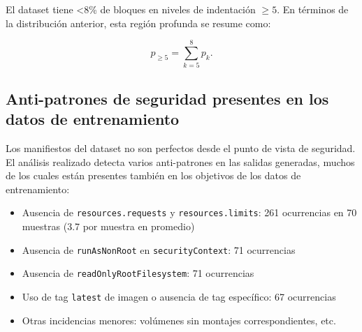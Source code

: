 El dataset tiene <8\% de bloques en niveles de indentación $\geq 5$. En términos de la distribución anterior, esta región profunda se resume como:

\[
p_{\geq 5} = \sum_{k=5}^{8} p_k.
\]

\subsection{Anti-patrones de seguridad presentes en los datos de entrenamiento}

Los manifiestos del dataset no son perfectos desde el punto de vista de seguridad. El análisis realizado detecta varios anti-patrones en las salidas generadas, muchos de
los cuales
están presentes también en los objetivos de los datos de entrenamiento:

\begin{itemize}
\item Ausencia de \texttt{resources.requests} y \texttt{resources.limits}: 261 ocurrencias en 70 muestras (3.7 por muestra en promedio)
\item Ausencia de \texttt{runAsNonRoot} en \texttt{securityContext}: 71 ocurrencias
\item Ausencia de \texttt{readOnlyRootFilesystem}: 71 ocurrencias
\item Uso de tag \texttt{latest} de imagen o ausencia de tag específico: 67 ocurrencias
\item Otras incidencias menores: volúmenes sin montajes correspondientes, etc.
\end{itemize}
